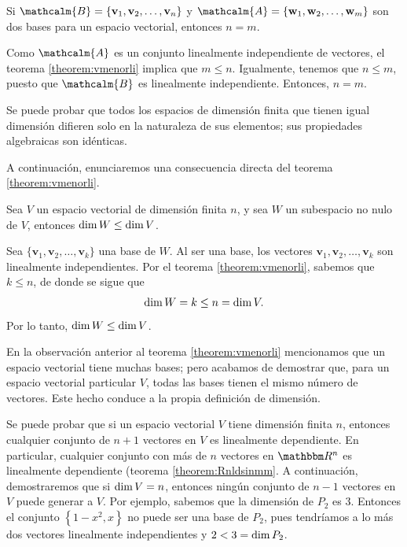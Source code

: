 \begin{corollary}{}{}
    Si $\mathcalm{B} = \{\mathbf{v}_1, \mathbf{v}_2, \dots, \mathbf{v}_n\}$ y $\mathcalm{A} = \{\mathbf{w}_1, \mathbf{w}_2, \dots, \mathbf{w}_m\}$ son dos bases para un espacio vectorial, entonces $n = m$.

    \tcblower
    \demostracion Como $\mathcalm{A}$ es un conjunto linealmente independiente de vectores, el teorema \ref{theorem:vmenorli} implica que $m \leq n$. Igualmente, tenemos que $n \leq m$, puesto que $\mathcalm{B}$ es linealmente independiente. Entonces, $n = m$.
\end{corollary}

Se puede probar que todos los espacios de dimensión finita que tienen igual dimensión difieren solo en la naturaleza de sus elementos; sus propiedades algebraicas son idénticas.

A continuación, enunciaremos una consecuencia directa del teorema \ref{theorem:vmenorli}.

\begin{theorem}{}{}
    Sea $V$ un espacio vectorial de dimensión finita $n$, y sea $W$ un subespacio no nulo de $V$, entonces $\operatorname{dim} W \leq \operatorname{dim} V$.

    \tcblower
    \demostracion Sea $\{ \mathbf{v}_1, \mathbf{v}_2, \dots, \mathbf{v}_k \}$ una base de $W$. Al ser una base, los vectores $\mathbf{v}_1, \mathbf{v}_2, \dots, \mathbf{v}_k$ son linealmente independientes. Por el teorema \ref{theorem:vmenorli}, sabemos que $k \leq n$, de donde se sigue que
    $$\operatorname{dim} W = k \leq n = \operatorname{dim} V.$$
    Por lo tanto, $\operatorname{dim} W \leq \operatorname{dim} V$.
\end{theorem}

En la observación anterior al teorema \ref{theorem:vmenorli} mencionamos que un espacio vectorial tiene muchas bases; pero acabamos de demostrar que, para un espacio vectorial particular $V$, todas las bases tienen el mismo número de vectores. Este hecho conduce a la propia definición de dimensión.

Se puede probar que si un espacio vectorial $V$ tiene dimensión finita $n$, entonces cualquier conjunto de $n + 1$ vectores en $V$ es linealmente dependiente. En particular, cualquier conjunto con más de $n$ vectores en $\RR[n]$ es linealmente dependiente (teorema \ref{theorem:Rnldsinmm}. A continuación, demostraremos que si $\operatorname{dim} V = n$, entonces ningún conjunto de $n - 1$ vectores en $V$ puede generar a $V$. Por ejemplo, sabemos que la dimensión de $P_2$ es $3$. Entonces el conjunto $\left\{ 1 - x^2, x \right\}$ no puede ser una base de $P_2$, pues tendríamos a lo más dos vectores linealmente independientes y $2 < 3 = \operatorname{dim} P_2$.

